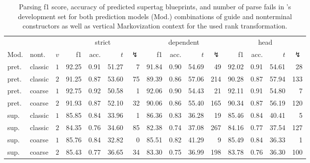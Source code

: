 \documentclass[../../document.tex]{subfiles}
\begin{document}
    \begin{table}
        \caption{\label{tbl:experiments:tiger}
        Parsing f1 score, accuracy of predicted supertag blueprints, and number of parse fails in 's development set for both prediction models (Mod.) combinations of guide and nonterminal constructors as well as vertical Markovization context for the used rank transformation.
        }
        \centering
        \setlength{\tabcolsep}{4pt}
        \vspace{.2cm}
        \begin{tabular}{llc|rrrr|rrrr|rrrr}
            \toprule
         &    &        & \multicolumn{4}{c|}{strict} & \multicolumn{4}{c|}{dependent} & \multicolumn{4}{c}{head}  \\
    Mod. & nont.   &\(v\)   & f1 & acc. & $t$ & $\lightning$ & f1 & acc. & $t$ & $\lightning$ & f1 & acc. & $t$ & $\lightning$ \\ \hline
    pret. & classic & \(1\)  & 92.25 & 0.91 & 51.27 & 7 & 91.84 & 0.90 & 54.69 & 49 & 92.02 & 0.91 & 54.61 & 28 \\
    pret. & classic & \(2\)  & 91.25 & 0.87 & 53.60 & 75 & 89.39 & 0.86 & 57.06 & 214 & 90.28 & 0.87 & 57.94 & 133 \\
    pret. & coarse  & \(1\)  & 92.75 & 0.92 & 50.58 & 1 & 92.06 & 0.90 & 54.43 & 21 & 92.11 & 0.91 & 54.80 & 7 \\
    pret. & coarse  & \(2\)  & 91.93 & 0.87 & 52.10 & 32 & 90.06 & 0.86 & 55.40 & 165 & 90.34 & 0.87 & 56.19 & 120 \\
    \midrule
    sup. & classic & \(1\)  & 85.85 & 0.84 & 33.96 & 1 & 86.36 & 0.83 & 36.28 & 19 & 85.46 & 0.84 & 40.41 & 5 \\
    sup. & classic & \(2\)  & 84.35 & 0.76 & 34.60 & 85 & 82.38 & 0.74 & 37.08 & 267 & 84.16 & 0.77 & 37.54 & 127 \\
    sup. & coarse  & \(1\)  & 85.76 & 0.84 & 32.82 & 0 & 85.51 & 0.82 & 41.29 & 9 & 85.49 & 0.84 & 36.33 & 1 \\
    sup. & coarse  & \(2\)  & 85.43 & 0.77 & 36.65 & 34 & 83.30 & 0.75 & 36.99 & 198 & 83.78 & 0.76 & 36.30 & 100 \\
    \bottomrule
        \end{tabular}
    \end{table}
\end{document}
